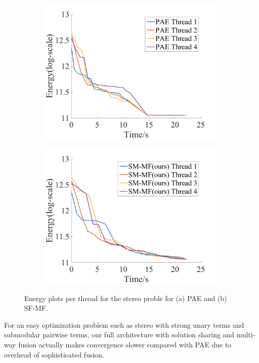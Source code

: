 \begin{figure}[!h]
\centering
\begin{subfigure}{0.49\textwidth}
\includegraphics[width=\textwidth]{figure/stereo_thread_pae.png}
\caption{}
\end{subfigure}
\begin{subfigure}{0.49\textwidth}
\includegraphics[width=\textwidth]{figure/stereo_thread_sf.png}
\caption{}
\end{subfigure}
\caption{Energy plots per thread for the stereo proble for (a) PAE and (b)
SF-MF.}
\label{fig:stereo_threads}
\end{figure}

For an easy optimization problem such as stereo with strong unary
terms and submodular pairwise terms, our full architecture with
solution sharing and multi-way fusion actually makes convergence
slower compared with PAE due to overhead of sophisticated fusion.





